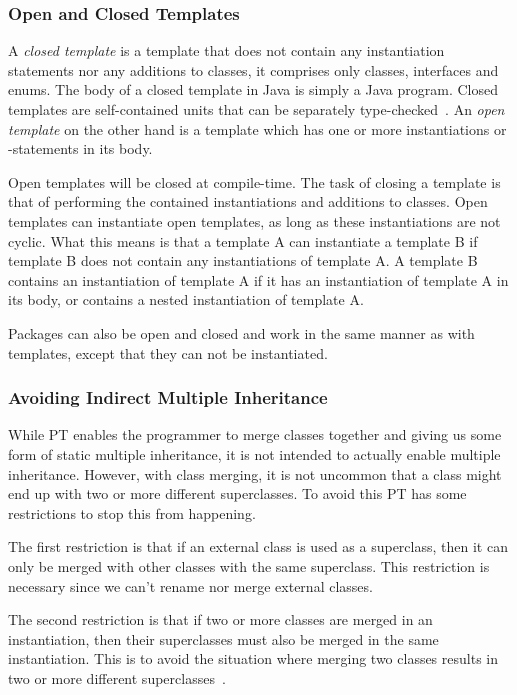 \subsubsection{Open and Closed Templates}\label{subsubsec:open-and-closed-templates}

A \textit{closed template} is a template that does not contain any instantiation statements nor any additions to classes, it comprises only classes, interfaces and enums.
The body of a closed template in Java is simply a Java program.
Closed templates are self-contained units that can be separately type-checked~\cite{Axelsen2012}.
An \textit{open template} on the other hand is a template which has one or more instantiations or -statements in its body.

Open templates will be closed at compile-time.
The task of closing a template is that of performing the contained instantiations and additions to classes.
Open templates can instantiate open templates, as long as these instantiations are not cyclic.
What this means is that a template A can instantiate a template B if template B does not contain any instantiations of template A\@.
A template B contains an instantiation of template A if it has an instantiation of template A in its body, or contains a nested instantiation of template A\@.

Packages can also be open and closed and work in the same manner as with templates, except that they can not be instantiated.

\subsubsection{Avoiding Indirect Multiple Inheritance}\label{subsubsec:avoiding-indirect-multiple-inheritance}

While PT enables the programmer to merge classes together and giving us some form of static multiple inheritance, it is not intended to actually enable multiple inheritance.
However, with class merging, it is not uncommon that a class might end up with two or more different superclasses.
To avoid this PT has some restrictions to stop this from happening.

The first restriction is that if an external class is used as a superclass, then it can only be merged with other classes with the same superclass.
This restriction is necessary since we can't rename nor merge external classes.

The second restriction is that if two or more classes are merged in an instantiation, then their superclasses must also be merged in the same instantiation.
This is to avoid the situation where merging two classes results in two or more different superclasses~\cite{jot}.
